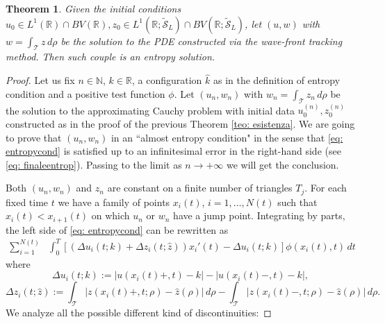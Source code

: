 \documentclass[12pt]{article}
\newcommand{\R}{\mathbb{R}}
\newcommand{\N}{\mathbb{N}}
\newcommand{\T}{\mathcal{T}}
\newcommand{\p}{\rho}
\newcommand{\1}{\mathds{1}}
\newtheorem{teo}{Theorem}[section]
\theoremstyle{definition}
\begin{document}
\begin{teo}
    Given the initial conditions $u_0\in L^1(\R)\cap BV(\R),z_0\in L^1(\R;\tilde{\mathcal S}_L)\cap BV(\R;\tilde{\mathcal S}_L)$, let $(u,w)$ with $w=\int_\T z\, d\p$ be the solution to the PDE constructed via the wave-front tracking method. Then such couple is an entropy solution. 
\end{teo}
\begin{proof}
    Let us fix $n\in\N$, $k\in\R$, a configuration $\hat{k}$ as in the definition of entropy condition and a positive test function $\phi$. Let $(u_n,w_n)$ with $w_n=\int_\T z_n \, d\p$ be the solution to the approximating Cauchy problem with initial data $u^{(n)}_0,z_0^{(n)}$ constructed as in the proof of the previous Theorem \ref{teo: esistenza}. 
    We are going to prove that $(u_n,w_n)$ in an ``almost entropy condition" in the sense that \eqref{eq: entropycond} is satisfied up to an infinitesimal error in the right-hand side (see \eqref{eq: finaleentrop}). Passing to the limit as $n\to+\infty$ we will get the conclusion.
    
    Both $(u_n,w_n)$ and $z_n$ are constant on a finite number of triangles $T_j$. For each fixed time $t$ we have a family of points $x_i(t)$, $i=1,\dots, N(t)$ such that $x_i(t)< x_{i+1}(t)$ on which $u_n$ or $w_n$ have a jump point. Integrating by parts, the left side of \eqref{eq: entropycond} can be rewritten as
    \begin{equation}\label{eq: sommadisc}
        \begin{split}
        \sum_{i=1}^{N(t)}&\int_{0}^{T} \left[\left( \Delta u_i(t;k)+\Delta z_i(t;\hat{z}) \right) x_i'(t) - \Delta u_i(t;k)\right] \phi(x_i(t),t) \,dt
        \end{split} 
    \end{equation}
    where \[\Delta u_i(t;k):=|u(x_i(t)+,t)-k|-|u(x_i(t)-,t)-k|,\]
    \[\Delta z_i(t;\hat{z}):=\int_\T |z(x_i(t)+,t;\p)-\hat{z}(\p)|\,d\p-\int_\T |z(x_i(t)-,t;\p)-\hat{z}(\p)|\,d\p.\]
    We analyze all the possible different kind of discontinuities:  \par 
    

\end{proof}
\end{document}

